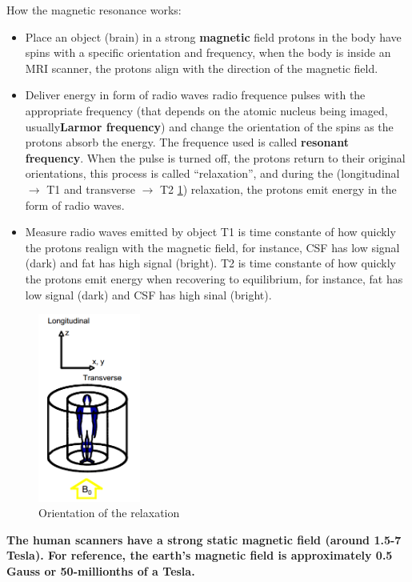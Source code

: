 \documentclass[12pt,article,oneside,a4paper]{memoir}
\begin{document}
How the magnetic resonance works:
\begin{itemize}
\item Place an object (brain) in a strong \textbf{magnetic} field
\subitem protons in the body have spins with a specific orientation and frequency, when the body is inside an MRI scanner, the protons align with the direction of the magnetic field.
\item Deliver energy in form of radio waves
\subitem radio frequence pulses with the appropriate frequency (that depends on the atomic nucleus being imaged, usually\textbf{Larmor frequency}) and change the orientation of the spins as the protons absorb the energy. The frequence used is called \textbf{resonant frequency}. When the pulse is turned off, the protons return to their original orientations, this process is called ``relaxation'', and during the (longitudinal $\rightarrow$ T1 and transverse $\rightarrow$ T2 \ref{fig:orientation-relaxation}) relaxation, the protons emit energy in the form of radio waves.
\item Measure radio waves emitted by object
\subitem T1 is time constante of how quickly the protons realign with the magnetic field, for instance, CSF has low signal (dark) and fat has high signal (bright).
\subitem T2 is time constante of how quickly the protons emit energy when recovering to equilibrium, for instance, fat has low signal (dark) and CSF has high sinal (bright).
\end{itemize}

\begin{figure}
  \centering
  \includegraphics[width=0.3\textwidth]{imgs/mri-longitudinal-transverse.png}
  \caption{Orientation of the relaxation}
  \label{fig:orientation-relaxation}
\end{figure}

\textbf{The human scanners have a strong static magnetic field (around 1.5-7 Tesla). For reference, the earth's magnetic field is approximately 0.5 Gauss or 50-millionths of a Tesla.}
\end{document}
